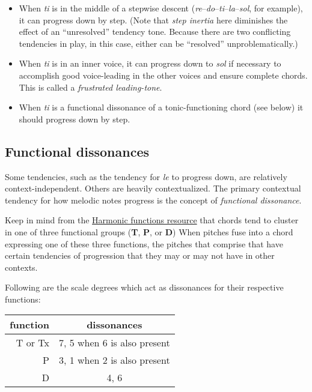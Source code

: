 \documentclass{book}
\providecommand{\tightlist}{%
  \setlength{\itemsep}{0pt}\setlength{\parskip}{0pt}}
\begin{document}
\begin{itemize}
\tightlist
\item
  When \emph{ti} is in the middle of a stepwise descent
  (\emph{re}--\emph{do}--\emph{ti}--\emph{la}--\emph{sol}, for example), it
  can progress down by step. (Note that \emph{step inertia} here diminishes
  the effect of an ``unresolved'' tendency tone. Because there are two
  conflicting tendencies in play, in this case, either can be ``resolved''
  unproblematically.)\\
\item
  When \emph{ti} is in an inner voice, it can progress down to \emph{sol} if
  necessary to accomplish good voice-leading in the other voices and ensure
  complete chords. This is called a \emph{frustrated leading-tone}.\\
\item
  When \emph{ti} is a functional dissonance of a tonic-functioning chord (see
  below) it should progress down by step.
\end{itemize}

\hypertarget{functional-dissonances}{%
\subsection{Functional dissonances}\label{functional-dissonances}}

Some tendencies, such as the tendency for \emph{le} to progress down, are
relatively context-independent. Others are heavily contextualized. The primary
contextual tendency for how melodic notes progress is the concept of
\emph{functional dissonance}.

Keep in mind from the \href{harmonicFunctions.html}{Harmonic functions
resource} that chords tend to cluster in one of three functional groups
(\textbf{T}, \textbf{P}, or \textbf{D}) When pitches fuse into a chord
expressing one of these three functions, the pitches that comprise that have
certain tendencies of progression that they may or may not have in other
contexts.

Following are the scale degrees which act as dissonances for their respective
functions:

\begin{longtable}[]{@{}rc@{}}
\toprule
function & dissonances \\
\midrule
\endhead
T or Tx & 7, 5 when 6 is also present \\
P & 3, 1 when 2 is also present \\
D & 4, 6 \\
\bottomrule
\end{longtable}
\end{document}
